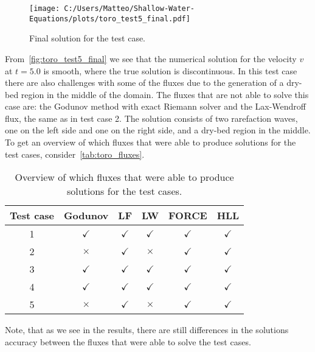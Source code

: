 \begin{figure}[H]
    \centering
    \texttt{[image: C:/Users/Matteo/Shallow-Water-Equations/plots/toro\_test5\_final.pdf]}
    \caption{Final solution for the test case.}\label{fig:toro_test5_final}
\end{figure}
From~\autoref{fig:toro_test5_final} we see that the numerical solution for the velocity $v$ at $t=5.0$ is smooth, where the true solution is discontinuous. 
In this test case there are also challenges with some of the fluxes due to the generation of a dry-bed region in the middle of the domain.
The fluxes that are not able to solve this case are: the Godunov method with exact Riemann solver and the Lax-Wendroff flux, the same as in test case 2.
The solution consists of two rarefaction waves, one on the left side and one on the right side, and a dry-bed region in the middle.
To get an overview of which fluxes that were able to produce solutions for the test cases, consider~\autoref{tab:toro_fluxes}.
\begin{table}[H]
    \centering
    \begin{tabular}{c|c|c|c|c|c}
        \hline
        \textbf{Test case} & \textbf{Godunov} & \textbf{LF} & \textbf{LW} & \textbf{FORCE} & \textbf{HLL}   \\
        \hline\hline
        1 & $\checkmark$ & $\checkmark$ & $\checkmark$ & $\checkmark$ & $\checkmark$   \\
        2 & $\times$ & $\checkmark$ & $\times$ & $\checkmark$ & $\checkmark$ \\
        3 & $\checkmark$ & $\checkmark$ & $\checkmark$ & $\checkmark$ & $\checkmark$  \\
        4 & $\checkmark$ & $\checkmark$ & $\checkmark$ & $\checkmark$ & $\checkmark$  \\
        5 & $\times$ & $\checkmark$ & $\times$ & $\checkmark$ & $\checkmark$  \\
        \hline
    \end{tabular}
    \caption{Overview of which fluxes that were able to produce solutions for the test cases.}\label{tab:toro_fluxes}
\end{table}
Note, that as we see in the results, there are still differences in the solutions accuracy between the fluxes that were able to solve the test cases.


